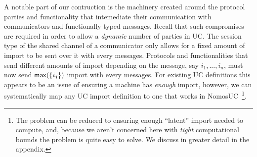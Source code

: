 A notable part of our contruction is the machinery created around the protocol parties and functionality that intemediate their communication with communicators and functionally-typed messages.
Recall that such compromises are required in order to allow a \emph{dynamic} number of parties in UC.
The session type of the shared channel of a communicator only allows for a fixed amount of import to be sent over it with every messages. 
Protocols and functionalities that send different amounts of import depending on the message, say $i_1,...,i_n$, must now send $\mathsf{max}(\{i_j\})$ import with every messages.
For existing UC definitions this appears to be an issue of ensuring a machine has \emph{enough} import, however, we can systematically map any UC import definition to one that works in NomosUC~\footnote{The problem can be reduced to ensuring enough ``latent'' import needed to compute, and, because we aren't concerned here with \emph{tight} computational bounds the problem is quite easy to solve. We discuss in greater detail in the appendix.}.


